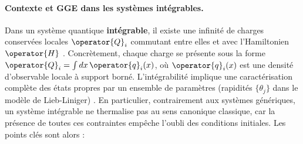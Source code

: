 %
%
%
%
%
%
%



\paragraph{Contexte et GGE dans les systèmes intégrables.}

Dans un système quantique {\bf intégrable}, il existe une infinité de charges conservées locales $\operator{Q}_i$ commutant entre elles et avec l’Hamiltonien $\operator{H}$  \cite{rigol2007relaxation, rigol2007}. Concrètement, chaque charge se présente sous la forme $\operator{Q}_i = \int dx \,\operator{q}_i(x)$, où $\operator{q}_i(x)$ est une densité d’observable locale à support borné. L’intégrabilité implique une caractérisation complète des états propres par un ensemble de paramètres (rapidités $\{\theta_j\}$ dans le modèle de Lieb-Liniger) \cite{Nardis_2016}. En particulier, contrairement aux systèmes génériques, un système intégrable ne thermalise pas au sens canonique classique, car la présence de toutes ces contraintes empêche l’oubli des conditions initiales. Les points clés sont alors :

